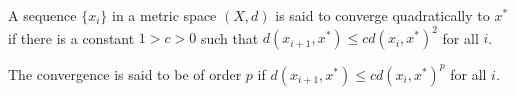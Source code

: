 \documentclass[12pt]{article}
\begin{document}
A sequence $\{x_i\}$ in a metric space $(X,d)$ is said to converge quadratically to $x^*$ if there is a constant $1>c>0$ such that $d(x_{i+1},x^*) \leq c d(x_i,x^*)^2$ for all $i$.

The convergence is said to be of order $p$ if $d(x_{i+1},x^*) \leq c d(x_i,x^*)^p$ for all $i$.
\end{document}
